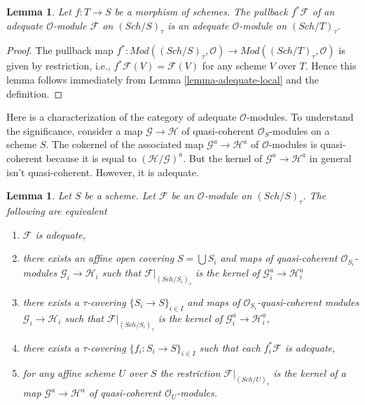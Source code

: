 \documentclass{stacks-project}
\theoremstyle{plain}
\newtheorem{lemma}[subsection]{Lemma}
\theoremstyle{definition}
\theoremstyle{remark}
\numberwithin{equation}{subsection}
\def\Sch{\mathit{Sch}}
\begin{document}
\begin{lemma}
\label{lemma-pullback-adequate}
Let $f : T \to S$ be a morphism of schemes.
The pullback $f^*\mathcal{F}$ of an adequate $\mathcal{O}$-module
$\mathcal{F}$ on $(\Sch/S)_\tau$ is an adequate
$\mathcal{O}$-module on $(\Sch/T)_\tau$.
\end{lemma}

\begin{proof}
The pullback map
$f^* : \textit{Mod}((\Sch/S)_\tau, \mathcal{O}) \to
\textit{Mod}((\Sch/T)_\tau, \mathcal{O})$
is given by restriction, i.e., $f^*\mathcal{F}(V) = \mathcal{F}(V)$
for any scheme $V$ over $T$. Hence this lemma follows immediately from
Lemma \ref{lemma-adequate-local}
and the definition.
\end{proof}

\noindent
Here is a characterization of the category of adequate $\mathcal{O}$-modules.
To understand the significance, consider a map $\mathcal{G} \to \mathcal{H}$
of quasi-coherent $\mathcal{O}_S$-modules on a scheme $S$.
The cokernel of the associated map $\mathcal{G}^a \to \mathcal{H}^a$
of $\mathcal{O}$-modules is quasi-coherent because it is equal to
$(\mathcal{H}/\mathcal{G})^a$. But the kernel of
$\mathcal{G}^a \to \mathcal{H}^a$ in general isn't
quasi-coherent. However, it is adequate.

\begin{lemma}
\label{lemma-adequate-characterize}
Let $S$ be a scheme. Let $\mathcal{F}$ be an $\mathcal{O}$-module on
$(\Sch/S)_\tau$. The following are equivalent
\begin{enumerate}
\item $\mathcal{F}$ is adequate,
\item there exists an affine open covering $S = \bigcup S_i$ and
maps of quasi-coherent $\mathcal{O}_{S_i}$-modules
$\mathcal{G}_i \to \mathcal{H}_i$
such that $\mathcal{F}|_{(\Sch/S_i)_\tau}$ is the
kernel of $\mathcal{G}_i^a \to \mathcal{H}_i^a$
\item there exists a $\tau$-covering $\{S_i \to S\}_{i \in I}$ and
maps of $\mathcal{O}_{S_i}$-quasi-coherent modules
$\mathcal{G}_i \to \mathcal{H}_i$
such that $\mathcal{F}|_{(\Sch/S_i)_\tau}$ is the
kernel of $\mathcal{G}_i^a \to \mathcal{H}_i^a$,
\item there exists a $\tau$-covering $\{f_i : S_i \to S\}_{i \in I}$
such that each $f_i^*\mathcal{F}$ is adequate,
\item for any affine scheme $U$ over $S$ the restriction
$\mathcal{F}|_{(\Sch/U)_\tau}$ is the kernel
of a map $\mathcal{G}^a \to \mathcal{H}^a$ of quasi-coherent
$\mathcal{O}_U$-modules.
\end{enumerate}
\end{lemma}
\end{document}
